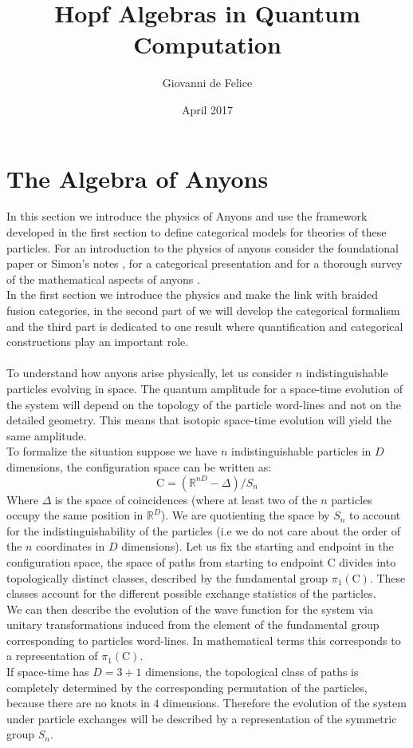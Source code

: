 \documentclass{article}
\title{Hopf Algebras in Quantum Computation}
\author{Giovanni de Felice}
\date{April 2017}
\begin{document}
	
\section{The Algebra of Anyons}
In this section we introduce the physics of Anyons and use the framework developed in the first section to define categorical models for theories of these particles. For an introduction to the physics of anyons consider the foundational paper \cite{Kitaev06} or Simon's notes \cite{Simon16}, for a categorical presentation \cite{Panangaden11} and for a thorough survey of the mathematical aspects of anyons \cite{Rowell17}.\\
In the first section we introduce the physics and make the link with braided fusion categories, in the second part of we will develop the categorical formalism and the third part is dedicated to one result where quantification and categorical constructions play an important role.\\~\\
To understand how anyons arise physically, let us consider $n$ indistinguishable particles evolving in space. The quantum amplitude for a space-time evolution of the system will depend on the topology of the particle word-lines and not on the detailed geometry. This means that isotopic space-time evolution will yield the same amplitude.\\
To formalize the situation suppose we have $n$ indistinguishable particles in $D$ dimensions, the configuration space can be written as:
$$ \mathrm{C}=(\mathbb{R}^{nD}-\Delta)/S_n$$
Where $\Delta$ is the space of coincidences (where at least two of the $n$ particles occupy the same position in $\mathbb{R}^D$). We are quotienting the space by $S_n$ to account for the indistinguishability of the particles (i.e we do not care about the order of the $n$ coordinates in $D$ dimensions). 
Let us fix the starting and endpoint in the configuration space, the space of paths from starting to endpoint $\mathrm{C}$ divides into topologically distinct classes, described by the fundamental group $\pi_1(\mathrm{C})$. These classes account for the different possible exchange statistics of the particles.\\
We can then describe the evolution of the wave function for the system via unitary transformations induced from the element of the fundamental group corresponding to particles word-lines. In mathematical terms this corresponds to a representation of $\pi_1(\mathrm{C})$. \\
If space-time has $D=3+1$ dimensions, the topological class of paths is completely determined by the corresponding permutation of the particles, because there are no knots in $4$ dimensions. Therefore the evolution of the system under particle exchanges will be described by a representation of the symmetric group $S_n$.
\end{document}
